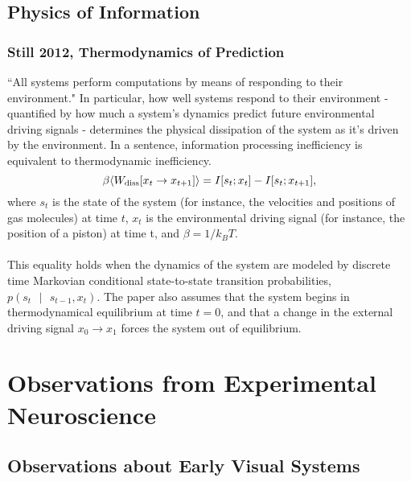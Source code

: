 \documentclass{article}
\newcommand{\given}{\mbox{ } | \mbox{ }}
\begin{document}
\subsection{Physics of Information}
\subsubsection{Still 2012, Thermodynamics of Prediction}
``All systems perform computations by means of responding to their environment."  In particular, how well systems respond to their environment - quantified by how much a system's dynamics predict future environmental driving signals - determines the physical dissipation of the system as it's driven by the environment.  In a sentence, information processing inefficiency is equivalent to thermodynamic inefficiency.
\begin{equation}
\beta \langle W_{\rm diss} [x_t \to x_{t + 1}] \rangle = I[s_t; x_t] - I[s_t; x_{t + 1}],
\end{equation}
where $s_t$ is the state of the system (for instance, the velocities and positions of gas molecules) at time $t$, $x_t$ is the environmental driving signal (for instance, the position of a piston) at time t, and $\beta = 1/k_B T$. \\
\\
This equality holds when the dynamics of the system are modeled by discrete time Markovian conditional state-to-state transition probabilities, $p(s_t \given s_{t - 1}, x_t)$.  The paper also assumes that the system begins in thermodynamical equilibrium at time $t = 0$, and that a change in the external driving signal $x_0 \to x_1$ forces the system out of equilibrium.


\section{Observations from Experimental Neuroscience}
\subsection{Observations about Early Visual Systems}
\end{document}
